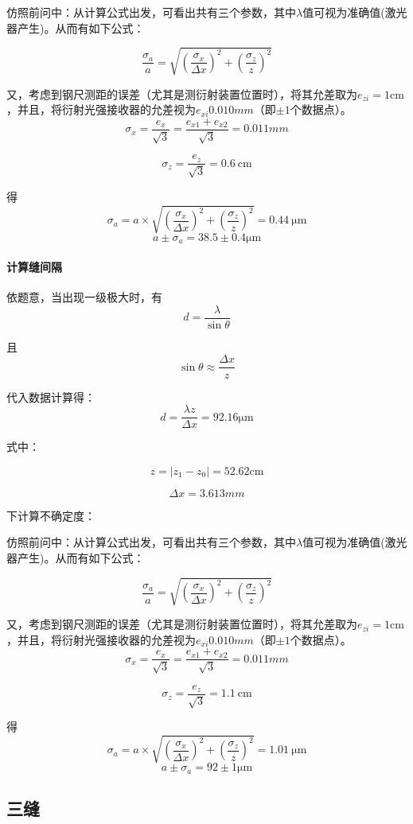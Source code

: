 \documentclass{ctexart}
\begin{document}
仿照前问中：从计算公式出发，可看出共有三个参数，其中$\lambda$值可视为准确值(激光器产生)。从而有如下公式：

$$\frac{\sigma_a}a=\sqrt{(\frac{\sigma_x}{\Delta x})^2+(\frac{\sigma_z}z)^2}$$

又，考虑到钢尺测距的误差（尤其是测衍射装置位置时），将其允差取为$e_{zi}=1\si{\centi\meter} $，并且，将衍射光强接收器的允差视为$e_{xi}0.010\si{mm}$（即$\pm 1$个数据点）。
$$\sigma_x=\frac{e_x}{\sqrt{3}}=\frac{e_{x1}+e_{x2}}{\sqrt{3}}=0.011\si{mm}$$

$$\sigma_z=\frac{e_z}{\sqrt{3}}=\SI{0.6}{\centi\meter}$$

得$$\sigma_a=a\times\sqrt{(\frac{\sigma_x}{\Delta x})^2+(\frac{\sigma_z}z)^2}=\SI{0.44}{\micro \meter}  $$ 
$$a \pm \sigma_a=38.5\pm 0.4 \si{\micro \meter}$$

\paragraph{计算缝间隔}

依题意，当出现一级极大时，有$$d=\frac{\lambda}{\sin{\theta}}$$

且$$\sin{\theta}\approx \frac{\Delta x}{z}$$

代入数据计算得：$$d=\frac{\lambda z}{\Delta x}=92.16\si{\micro \meter}$$

式中：

$$ z=|z_1-z_0|=52.62\si{\centi \meter}$$

$$ \Delta x=3.613\si{mm}$$

下计算不确定度：

仿照前问中：从计算公式出发，可看出共有三个参数，其中$\lambda$值可视为准确值(激光器产生)。从而有如下公式：

$$\frac{\sigma_a}a=\sqrt{(\frac{\sigma_x}{\Delta x})^2+(\frac{\sigma_z}z)^2}$$

又，考虑到钢尺测距的误差（尤其是测衍射装置位置时），将其允差取为$e_{zi}=1\si{\centi\meter} $，并且，将衍射光强接收器的允差视为$e_{xi}0.010\si{mm}$（即$\pm 1$个数据点）。
$$\sigma_x=\frac{e_x}{\sqrt{3}}=\frac{e_{x1}+e_{x2}}{\sqrt{3}}=0.011\si{mm}$$

$$\sigma_z=\frac{e_z}{\sqrt{3}}=\SI{1.1}{\centi\meter}$$

得$$\sigma_a=a\times\sqrt{(\frac{\sigma_x}{\Delta x})^2+(\frac{\sigma_z}z)^2}=\SI{1.01}{\micro \meter}  $$ 
$$a \pm \sigma_a=92\pm 1 \si{\micro \meter}$$

\subsection{三缝}
\end{document}
